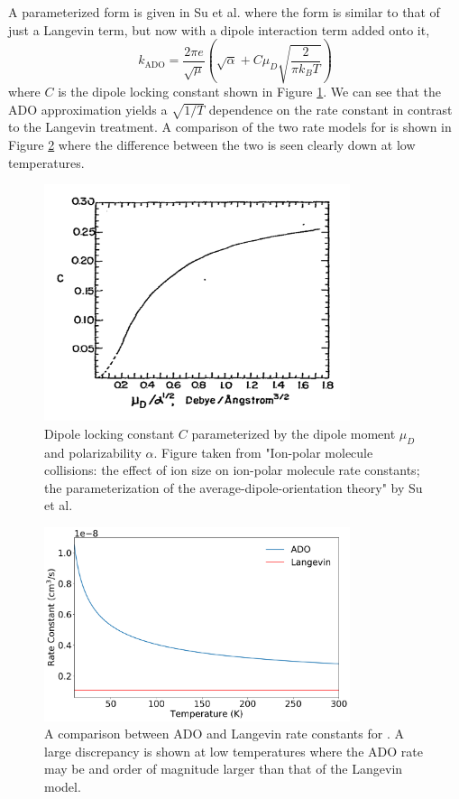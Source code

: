 A parameterized form is given in Su et al. where the form is similar to that of just a Langevin term, but now with a dipole interaction term added onto it,
\begin{equation}
    k_{\mathrm{ADO}} = \frac{2 \pi e}{\sqrt{\mu}}\left(\sqrt{\alpha}+C \mu_D\sqrt{\frac{2}{\pi k_B T}}\right)
    \label{eq: k ADO}
\end{equation}
where $C$ is the dipole locking constant shown in Figure \ref{fig: C}.\cite{Su1973a}\cite{Troe1985} We can see that the ADO approximation yields a $\sqrt{1/T}$ dependence on the rate constant in contrast to the Langevin treatment. A comparison of the two rate models for  is shown in Figure \ref{fig: ADO Langevin} where the difference between the two is seen clearly down at low temperatures.

\begin{figure}[H]
	\label{fig: C}
	\centering
	\includegraphics[width=0.8\textwidth]{images/ADO_C.pdf}
	\caption{Dipole locking constant $C$ parameterized by the dipole moment $\mu_D$ and polarizability $\alpha$. Figure taken from "Ion-polar molecule collisions: the effect of ion size on ion-polar molecule rate constants; the parameterization of the average-dipole-orientation theory" by Su et al.\cite{Su1973a}}
\end{figure}

\begin{figure}[H]
	\centering
	\includegraphics[width=0.8\textwidth]{images/ADO_Langevin_compare.png}
	\caption{A comparison between ADO and Langevin rate constants for . A large discrepancy is shown at low temperatures where the ADO rate may be and order of magnitude larger than that of the Langevin model.}
	\label{fig: ADO Langevin}
\end{figure}


